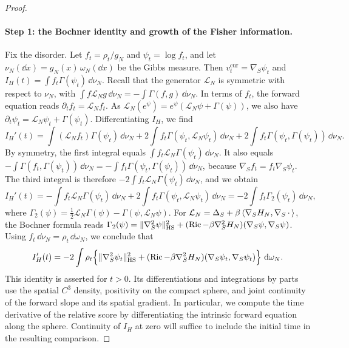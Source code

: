 \begin{proof}
\paragraph{Step 1: the Bochner identity and growth of the Fisher information.}
Fix the disorder. Let $f_t=\rho_t/g_N$ and $\psi_t=\log f_t$, and let $\nu_N(\dd x)=g_N(x)\,\omega_N(\dd x)$ be the Gibbs measure. Then $v^{\mathrm{cur}}_t=\nabla_S\psi_t$ and $I_H(t)=\int f_t\Gamma(\psi_t)\,\dd\nu_N$. Recall that the generator $\mathcal L_N$ is symmetric with respect to $\nu_N$, with $\int f\mathcal L_Ng\,\dd\nu_N=-\int\Gamma(f,g)\,\dd\nu_N$. In terms of $f_t$, the forward equation reads $\partial_tf_t=\mathcal L_Nf_t$. As $\mathcal L_N(e^{\psi})=e^{\psi}(\mathcal L_N\psi+\Gamma(\psi))$, we also have $\partial_t\psi_t=\mathcal L_N\psi_t+\Gamma(\psi_t)$. Differentiating $I_H$, we find
\[
 I_H'(t)=\int(\mathcal L_Nf_t)\Gamma(\psi_t)\,\dd\nu_N
 +2\int f_t\Gamma(\psi_t,\mathcal L_N\psi_t)\,\dd\nu_N
 +2\int f_t\Gamma(\psi_t,\Gamma(\psi_t))\,\dd\nu_N.
\]
By symmetry, the first integral equals $\int f_t\mathcal L_N\Gamma(\psi_t)\,\dd\nu_N$. It also equals $-\int\Gamma(f_t,\Gamma(\psi_t))\,\dd\nu_N=-\int f_t\Gamma(\psi_t,\Gamma(\psi_t))\,\dd\nu_N$, because $\nabla_Sf_t=f_t\nabla_S\psi_t$. The third integral is therefore $-2\int f_t\mathcal L_N\Gamma(\psi_t)\,\dd\nu_N$, and we obtain
\[
 I_H'(t)=-\int f_t\mathcal L_N\Gamma(\psi_t)\,\dd\nu_N+2\int f_t\Gamma(\psi_t,\mathcal L_N\psi_t)\,\dd\nu_N
 =-2\int f_t\Gamma_2(\psi_t)\,\dd\nu_N,
\]
where $\Gamma_2(\psi)=\frac12\mathcal L_N\Gamma(\psi)-\Gamma(\psi,\mathcal L_N\psi)$. For $\mathcal L_N=\Delta_S+\beta\left\langle\nabla_SH_N,\nabla_S\,\cdot\,\right\rangle$, the Bochner formula reads $\Gamma_2(\psi)=\lVert\nabla_S^2\psi\rVert_{\mathrm{HS}}^2+(\operatorname{Ric}-\beta\nabla_S^2H_N)(\nabla_S\psi,\nabla_S\psi)$. Using $f_t\,\dd\nu_N=\rho_t\,\dd\omega_N$, we conclude that
\begin{equation}
 I_H'(t)=-2\int\rho_t\Bigl\{
 \lVert\nabla_S^2\psi_t\rVert_{\mathrm{HS}}^2
 +(\operatorname{Ric}-\beta\nabla_S^2H_N)(\nabla_S\psi_t,\nabla_S\psi_t)\Bigr\}\,\mathop{}\!\mathrm d\omega_N.
 \label{eq:fisher-bochner-identity}
\end{equation}
This identity is asserted for $t>0$. Its differentiations and integrations by parts use the spatial $C^3$ density, positivity on the compact sphere, and joint continuity of the forward slope and its spatial gradient. In particular, we compute the time derivative of the relative score by differentiating the intrinsic forward equation along the sphere. Continuity of $I_H$ at zero will suffice to include the initial time in the resulting comparison.


\end{proof}
